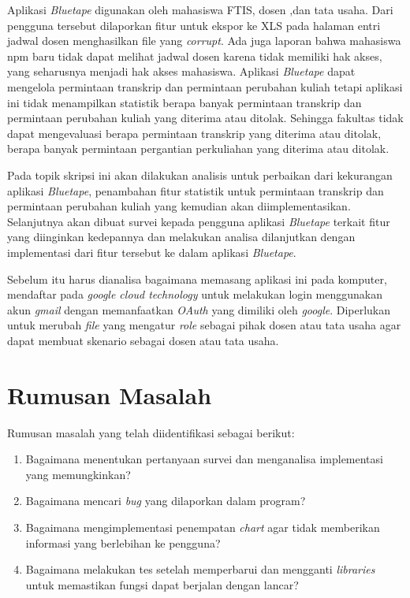 Aplikasi \textit{Bluetape} digunakan oleh mahasiswa FTIS, dosen ,dan tata usaha. Dari pengguna tersebut dilaporkan fitur untuk ekspor ke XLS pada halaman entri jadwal dosen menghasilkan file yang \textit{corrupt}. Ada juga laporan bahwa mahasiswa npm baru tidak dapat melihat jadwal dosen karena tidak memiliki hak akses, yang seharusnya menjadi hak akses mahasiswa. Aplikasi \textit{Bluetape} dapat mengelola permintaan transkrip dan permintaan perubahan kuliah tetapi aplikasi ini tidak menampilkan statistik berapa banyak permintaan transkrip  dan permintaan perubahan kuliah yang diterima atau ditolak. Sehingga fakultas tidak dapat mengevaluasi berapa permintaan transkrip yang diterima atau ditolak, berapa banyak permintaan pergantian perkuliahan yang diterima atau ditolak.


Pada topik skripsi ini akan dilakukan analisis untuk perbaikan dari kekurangan aplikasi \textit{Bluetape}, penambahan fitur statistik untuk permintaan transkrip dan permintaan perubahan kuliah yang kemudian akan diimplementasikan. Selanjutnya akan dibuat survei kepada pengguna aplikasi \textit{Bluetape} terkait fitur yang diinginkan kedepannya dan melakukan analisa dilanjutkan dengan implementasi dari fitur tersebut ke dalam aplikasi \textit{Bluetape}. 


Sebelum itu harus dianalisa bagaimana memasang aplikasi ini pada komputer, mendaftar pada \textit{google cloud technology} untuk melakukan login menggunakan akun \textit{gmail} dengan memanfaatkan \textit{OAuth} yang dimiliki oleh \textit{google}. Diperlukan untuk merubah \textit{ file} yang mengatur \textit{role} sebagai pihak dosen atau tata usaha agar dapat membuat skenario sebagai dosen atau tata usaha.



\section{Rumusan Masalah}
\label{sec:rumusan}
Rumusan masalah yang telah diidentifikasi sebagai berikut:
\begin{enumerate}
	\item Bagaimana menentukan pertanyaan survei dan menganalisa implementasi yang memungkinkan?
	\item Bagaimana mencari \textit{bug} yang dilaporkan dalam program?
	\item Bagaimana mengimplementasi penempatan \textit{chart} agar tidak memberikan informasi yang berlebihan
	ke pengguna?
	\item Bagaimana melakukan tes setelah memperbarui dan mengganti \textit{libraries} untuk memastikan fungsi dapat berjalan dengan lancar?

\end{enumerate}


